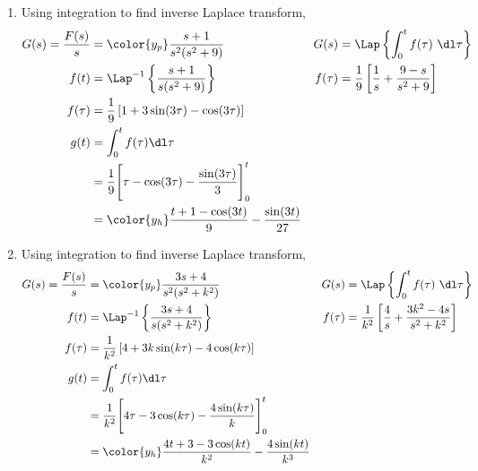 \begin{enumerate}
    \item Using integration to find inverse Laplace transform,
          \begin{align}
              G(s) = \frac{F(s)}{s} & = \color{y_p} \frac{s+1}{s^2(s^2 + 9)}   &
              G(s)                  & = \Lap\left\{ \int_{0}^{t}f(\tau)
              \ \dl \tau \right\}                                                \\
              f(t)                  & = \Lap^{-1}\left\{ \frac{s+1}
              {s(s^2 + 9)} \right\} &
              f(\tau)               & = \frac{1}{9} \left[ \frac{1}{s}
              + \frac{9-s}{s^2 + 9} \right]                                      \\
              f(\tau)               & =  \frac{1}{9}\left[ 1
              + 3\sin(3\tau) - \cos(3\tau)\right]                                \\
              g(t)                  & = \int_{0}^{t}
              f(\tau) \dl \tau                                                   \\
                                    & = \frac{1}{9}
              \Bigg[ \tau - \cos(3\tau) - \frac{\sin(3\tau)}{3}
              \Bigg]_0^t                                                         \\
                                    & = \color{y_h} \frac{t + 1 - \cos(3t)}{9}
              - \frac{\sin(3t)}{27}
          \end{align}

    \item Using integration to find inverse Laplace transform,
          \begin{align}
              G(s) = \frac{F(s)}{s}   & = \color{y_p} \frac{3s+4}{s^2(s^2 + k^2)}    &
              G(s)                    & = \Lap\left\{ \int_{0}^{t}f(\tau)
              \ \dl \tau \right\}                                                      \\
              f(t)                    & = \Lap^{-1}\left\{ \frac{3s+4}
              {s(s^2 + k^2)} \right\} &
              f(\tau)                 & = \frac{1}{k^2} \left[ \frac{4}{s}
              + \frac{3k^2 - 4s}{s^2 + k^2} \right]                                    \\
              f(\tau)                 & =  \frac{1}{k^2}\left[ 4
              + 3k\sin(k\tau) - 4\cos(k\tau)\right]                                    \\
              g(t)                    & = \int_{0}^{t}
              f(\tau) \dl \tau                                                         \\
                                      & = \frac{1}{k^2}
              \Bigg[ 4\tau - 3\cos(k\tau) - \frac{4\sin(k\tau)}{k}
              \Bigg]_0^t                                                               \\
                                      & = \color{y_h} \frac{4t + 3 - 3\cos(kt)}{k^2}
              - \frac{4\sin(kt)}{k^3}
          \end{align}


\end{enumerate}

